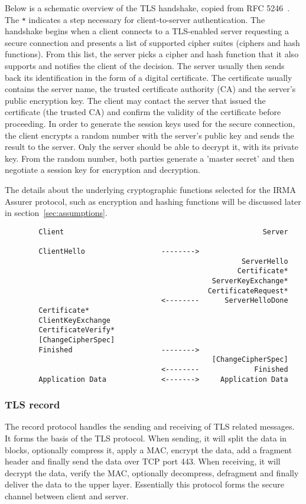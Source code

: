 Below is a schematic overview of the TLS handshake, copied from RFC 5246~\cite{tls1.2}. The \texttt{*} indicates a step necessary for client-to-server authentication. The handshake begins when a client connects to a TLS-enabled server requesting a secure connection and presents a list of supported cipher suites (ciphers and hash functions). From this list, the server picks a cipher and hash function that it also supports and notifies the client of the decision. The server usually then sends back its identification in the form of a digital certificate. The certificate usually contains the server name, the trusted certificate authority (CA) and the server's public encryption key. The client may contact the server that issued the certificate (the trusted CA) and confirm the validity of the certificate before proceeding. In order to generate the session keys used for the secure connection, the client encrypts a random number with the server's public key and sends the result to the server. Only the server should be able to decrypt it, with its private key. From the random number, both parties generate a 'master secret' and then negotiate a session key for encryption and decryption.

The details about the underlying cryptographic functions selected for the IRMA Assurer protocol, such as encryption and hashing functions will be discussed later in section~\ref{sec:assumptions}.
\begin{verbatim}
        Client                                               Server

        ClientHello                  -------->
                                                        ServerHello
                                                       Certificate*
                                                 ServerKeyExchange*
                                                CertificateRequest*
                                     <--------      ServerHelloDone
        Certificate*
        ClientKeyExchange
        CertificateVerify*
        [ChangeCipherSpec]
        Finished                     -------->
                                                 [ChangeCipherSpec]
                                     <--------             Finished
        Application Data             <------->     Application Data
\end{verbatim}


\subsubsection{TLS record}
The record protocol handles the sending and receiving of TLS related messages. It forms the basis of the TLS protocol. When sending, it will split the data in blocks, optionally compress it, apply a MAC, encrypt the data, add a fragment header and finally send the data over TCP port 443. When receiving, it will decrypt the data, verify the MAC, optionally decompress, defragment and finally deliver the data to the upper layer. Essentially this protocol forms the secure channel between client and server.

